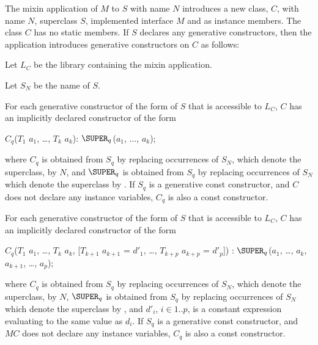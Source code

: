 \documentclass[makeidx]{article}
\begin{document}
\LMHash{}%
The mixin application of $M$ to $S$ with name $N$ introduces a new
class, $C$, with name $N$, superclass $S$,
implemented interface $M$
and  as instance members.
The class $C$ has no static members.
If $S$ declares any generative constructors, then the application
introduces generative constructors on $C$ as follows:

\LMHash{}%
Let $L_C$ be the library containing the mixin application.

Let $S_N$ be the name of $S$.

For each generative constructor of the form
of $S$ that is accessible to $L_C$, $C$ has
an implicitly declared constructor of the form

\begin{normativeDartCode}
$C_q$($T_{1}$ $a_{1}$, \ldots, $T_{k}$ $a_{k}$): $\SUPER_q$($a_{1}$, $\ldots$, $a_{k}$);
\end{normativeDartCode}

\noindent
where $C_q$ is obtained from $S_q$ by replacing occurrences of $S_N$,
which denote the superclass, by $N$, and $\SUPER_q$ is obtained from $S_q$ by
replacing occurrences of $S_N$ which denote the superclass by \SUPER.
If $S_q$ is a generative const constructor, and $C$ does not declare any
instance variables, $C_q$ is also a const constructor.

\LMHash{}%
For each generative constructor of the form
of $S$ that is accessible to $L_C$, $C$ has
an implicitly declared constructor of the form

\begin{normativeDartCode}
$C_q$($T_{1}$ $a_{1}$, \ldots , $T_{k}$ $a_{k}$, [$T_{k+1}$ $a_{k+1}$ = $d'_{1}$, \ldots , $T_{k+p}$ $a_{k+p}$ = $d'_p$])
    : $\SUPER_q$($a_{1}$, \ldots , $a_{k}$, $a_{k+1}$, \ldots, $a_p$);
\end{normativeDartCode}

\noindent
where $C_q$ is obtained from $S_q$ by replacing occurrences of $S_N$,
which denote the superclass, by $N$,
$\SUPER_q$ is obtained from $S_q$ by replacing occurrences of $S_N$
which denote the superclass by \SUPER,
and $d'_i$, $i \in 1..p$, is a constant expression evaluating
to the same value as $d_i$.
If $S_q$ is a generative const constructor, and $MC$ does not declare any
instance variables, $C_q$ is also a const constructor.
\end{document}
